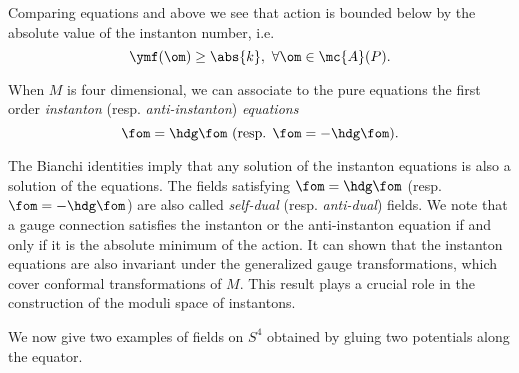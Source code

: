 Comparing equations  and  above we see that \ym action is bounded below by the absolute
value of the instanton number, i.e.
\begin{equation}
 \label{MM:8.24}
 \ymf(\om)\geq \abs{k}, \ \forall \om \in \mc{A}(P).
\end{equation}

When $M$ is four dimensional, we can associate to the pure \ym equations the first order \emph{instanton} (resp.
\emph{anti-instanton}) \emph{equations}
\begin{equation}
 \label{MM:8.25}
 \fom =\hdg \fom \ (\text{resp. } \fom=-\hdg \fom).
\end{equation}

The Bianchi identities imply that any solution of the instanton equations is also a solution of the \ym equations. The
fields satisfying $\fom= \hdg \fom$ (resp. $\fom = - \hdg \fom$) are also called \emph{self-dual} (resp.
\emph{anti-dual}) \ym fields. We note that a gauge connection satisfies the instanton or the anti-instanton equation if
and only if it is the absolute minimum of the \ym action. It can shown that the instanton equations are also invariant
under the generalized gauge transformations, which cover conformal transformations of $M$. This result plays a crucial
role in the construction of the moduli space of instantons.


We now give two examples of \ym fields on $S^{4}$ obtained by gluing two potentials along the equator.

